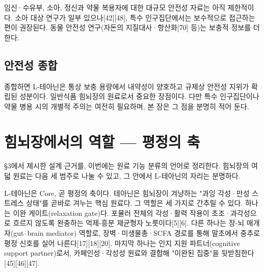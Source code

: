 \documentclass[12pt,oneside]{book}
\begin{document}
임신·수유부, 소아, 정신과 약물 복용자에 대한 대규모 안전성 자료는 아직 제한적이다. 소아 대상 연구가 일부 있으나[42][48], 특수 인구집단에서는 보수적으로 접근하는 편이 권장된다. 동물 안전성 연구(자돈의 지질대사·항산화[70] 등)는 보충적 정보를 더한다.

\subsection{안전성 종합}

종합하면 L-테아닌은 통상 보충 용량에서 내약성이 양호하고 규제상 안전성 지위가 확립된 성분이다. 일반식품 힘뇌장의 원료로서 중요한 장점이다. 다만 특수 인구집단이나 약물 병용 시의 개별적 주의는 여전히 필요하며, 본 장은 그 점을 분명히 적어 둔다.

\section{힘뇌장에서의 역할 — 평정의 축}

§3에서 제시한 설계 근거를, 이번에는 원료 기능 분류의 언어로 정리한다. 힘뇌장의 여덟 원료는 다음 세 범주로 나눌 수 있고, 그 안에서 L-테아닌의 자리는 분명하다.

\vspace{2pt}\vspace{3pt}

L-테아닌은 Core, 곧 평정의 축이다. 테아닌은 힘뇌장이 겨냥하는 "과잉 각성·만성 스트레스 상태"를 곧바로 겨누는 핵심 원료다. 그 역할은 세 가지로 간추릴 수 있다. 하나는 이완 게이트(relaxation gate)다. 포뮬러 전체의 각성·활력 작용이 초조·과각성으로 흐르지 않도록 완충하는 억제-흥분 재균형자 노릇이다[5][6]. 다른 하나는 장-뇌 매개자(gut–brain mediator) 역할로, 장벽·미생물총·SCFA 경로를 통해 말초에서 중추로 평정 신호를 실어 나른다[17][18][20]. 마지막 하나는 인지 지원 파트너(cognitive support partner)로서, 카페인성·각성성 원료와 결합해 "이완된 집중"을 뒷받침한다[45][46][47].
\end{document}
